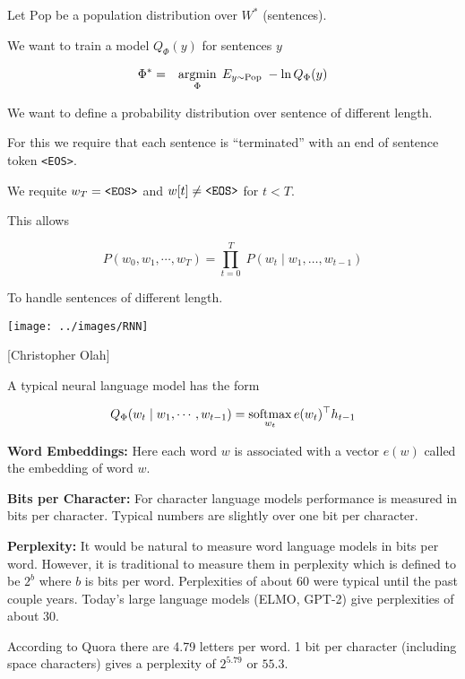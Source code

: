 {\vfill
Let $\mathrm{Pop}$ be a population distribution over $W^*$ (sentences).

\vfill
We want to train a model $Q_\Phi(y)$ for sentences $y$

\begin{eqnarray*}
\Phi^* & = & \operatorname*{argmin}_\Phi \; E_{y \sim \mathrm{Pop}}\;-\ln Q_\Phi(y)
\end{eqnarray*}


We want to define a probability distribution over sentence of different length.

\vfill
For this we require that each sentence is ``terminated'' with an end of sentence token {\tt <EOS>}.

\vfill
We requite $w_T = \mbox{\tt <EOS>}$ and $w[t] \not = \mbox{\tt <EOS>}$ for $t < T$.

\vfill
This allows

$$P(w_0, w_1, \cdots, w_T) = \prod_{t=0}^T\;P(w_t\;|\;w_1,\ldots,w_{t-1})$$

To handle sentences of different length.




\centerline{\texttt{[image: ../images/RNN]}}
\centerline{{\large [Christopher Olah]}}

A typical neural language model has the form

$$Q_\Phi(w_t\;|\;w_1,\cdots,w_{t-1}) = \operatorname*{softmax}_{w_t} e(w_t)^\top h_{t-1}$$

\vfill
{\bf Word Embeddings:} Here each word $w$ is associated with a vector $e(w)$ called the embedding of word $w$.



{\bf Bits per Character:}
For character language models performance is measured in bits per character.  Typical numbers are slightly over one bit per character.

\vfill
{\bf Perplexity:}
It would be natural to measure word language models in bits per word.  However, it is traditional to measure them in perplexity which is defined to be
$2^b$ where $b$ is bits per word.  Perplexities of about 60 were typical until the past couple years.  Today's large language models (ELMO, GPT-2) give
perplexities of about 30.

\vfill
According to Quora there are 4.79 letters per word.  1 bit per character (including space characters) gives a perplexity of $2^{5.79}$ or $55.3$.

}
